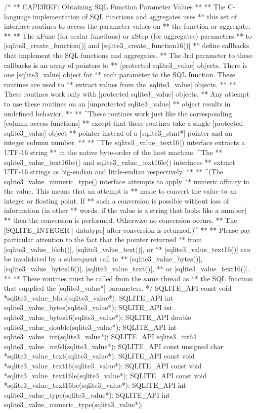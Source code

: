 \begin{Codex}[label=sqlite3.h,numbers=left]
{/*
** CAPI3REF: Obtaining SQL Function Parameter Values
**
** The C-language implementation of SQL functions and aggregates uses
** this set of interface routines to access the parameter values on
** the function or aggregate.
**
** The xFunc (for scalar functions) or xStep (for aggregates) parameters
** to [sqlite3_create_function()] and [sqlite3_create_function16()]
** define callbacks that implement the SQL functions and aggregates.
** The 3rd parameter to these callbacks is an array of pointers to
** [protected sqlite3_value] objects.  There is one [sqlite3_value] object for
** each parameter to the SQL function.  These routines are used to
** extract values from the [sqlite3_value] objects.
**
** These routines work only with [protected sqlite3_value] objects.
** Any attempt to use these routines on an [unprotected sqlite3_value]
** object results in undefined behavior.
**
** ^These routines work just like the corresponding [column access functions]
** except that these routines take a single [protected sqlite3_value] object
** pointer instead of a [sqlite3_stmt*] pointer and an integer column number.
**
** ^The sqlite3_value_text16() interface extracts a UTF-16 string
** in the native byte-order of the host machine.  ^The
** sqlite3_value_text16be() and sqlite3_value_text16le() interfaces
** extract UTF-16 strings as big-endian and little-endian respectively.
**
** ^(The sqlite3_value_numeric_type() interface attempts to apply
** numeric affinity to the value.  This means that an attempt is
** made to convert the value to an integer or floating point.  If
** such a conversion is possible without loss of information (in other
** words, if the value is a string that looks like a number)
** then the conversion is performed.  Otherwise no conversion occurs.
** The [SQLITE_INTEGER | datatype] after conversion is returned.)^
**
** Please pay particular attention to the fact that the pointer returned
** from [sqlite3_value_blob()], [sqlite3_value_text()], or
** [sqlite3_value_text16()] can be invalidated by a subsequent call to
** [sqlite3_value_bytes()], [sqlite3_value_bytes16()], [sqlite3_value_text()],
** or [sqlite3_value_text16()].
**
** These routines must be called from the same thread as
** the SQL function that supplied the [sqlite3_value*] parameters.
*/
SQLITE_API const void *sqlite3_value_blob(sqlite3_value*);
SQLITE_API int sqlite3_value_bytes(sqlite3_value*);
SQLITE_API int sqlite3_value_bytes16(sqlite3_value*);
SQLITE_API double sqlite3_value_double(sqlite3_value*);
SQLITE_API int sqlite3_value_int(sqlite3_value*);
SQLITE_API sqlite3_int64 sqlite3_value_int64(sqlite3_value*);
SQLITE_API const unsigned char *sqlite3_value_text(sqlite3_value*);
SQLITE_API const void *sqlite3_value_text16(sqlite3_value*);
SQLITE_API const void *sqlite3_value_text16le(sqlite3_value*);
SQLITE_API const void *sqlite3_value_text16be(sqlite3_value*);
SQLITE_API int sqlite3_value_type(sqlite3_value*);
SQLITE_API int sqlite3_value_numeric_type(sqlite3_value*);

}
\end{Codex}
